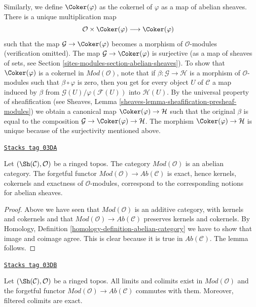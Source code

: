 \medskip\noindent
Similarly, we define $\Coker(\varphi)$ as the cokernel of
$\varphi$ as a map of abelian sheaves. There is a unique
multiplication map
$$
\mathcal{O} \times \Coker(\varphi) \longrightarrow \Coker(\varphi)
$$
such that the map $\mathcal{G} \to \Coker(\varphi)$ becomes a
morphism of $\mathcal{O}$-modules (verification omitted).
The map $\mathcal{G} \to \Coker(\varphi)$ is surjective
(as a map of sheaves of sets, see Section \ref{sites-modules-section-abelian-sheaves}).
To show that $\Coker(\varphi)$ is a cokernel in
$\textit{Mod}(\mathcal{O})$, note that if
$\beta : \mathcal{G} \to \mathcal{H}$ is a morphism of $\mathcal{O}$-modules
such that $\beta \circ \varphi$ is zero, then you get for every
object $U$ of $\mathcal{C}$ a map induced by $\beta$ from
$\mathcal{G}(U)/\varphi(\mathcal{F}(U))$ into $\mathcal{H}(U)$.
By the universal property of sheafification (see
Sheaves, Lemma \ref{sheaves-lemma-sheafification-presheaf-modules})
we obtain a canonical map $\Coker(\varphi) \to \mathcal{H}$
such that the original $\beta$ is equal to the composition
$\mathcal{G} \to \Coker(\varphi) \to \mathcal{H}$.
The morphism $\Coker(\varphi) \to \mathcal{H}$ is unique
because of the surjectivity mentioned above.

\begin{lemma}[Abelian]
\label{sites-modules-lemma-abelian}
\href{https://stacks.math.columbia.edu/tag/03DA}{\texttt{Stacks tag 03DA}}

Let $(\Sh(\mathcal{C}), \mathcal{O})$ be a ringed topos.
The category $\textit{Mod}(\mathcal{O})$ is an abelian category.
The forgetful functor
$\textit{Mod}(\mathcal{O}) \to \textit{Ab}(\mathcal{C})$
is exact, hence kernels, cokernels and exactness of
$\mathcal{O}$-modules, correspond to the corresponding notions
for abelian sheaves.
\end{lemma}

\begin{proof}
Above we have seen that $\textit{Mod}(\mathcal{O})$ is an additive
category, with kernels and cokernels
and that $\textit{Mod}(\mathcal{O}) \to \textit{Ab}(\mathcal{C})$
preserves kernels and cokernels.
By Homology, Definition \ref{homology-definition-abelian-category}
we have to show that image and coimage agree. This is clear
because it is true in $\textit{Ab}(\mathcal{C})$. The lemma follows.
\end{proof}

\begin{lemma}
\label{sites-modules-lemma-limits-colimits}
\href{https://stacks.math.columbia.edu/tag/03DB}{\texttt{Stacks tag 03DB}}

Let $(\Sh(\mathcal{C}), \mathcal{O})$ be a ringed topos.
All limits and colimits exist in $\textit{Mod}(\mathcal{O})$
and the forgetful functor
$\textit{Mod}(\mathcal{O}) \to \textit{Ab}(\mathcal{C})$
commutes with them. Moreover, filtered colimits are exact.
\end{lemma}

